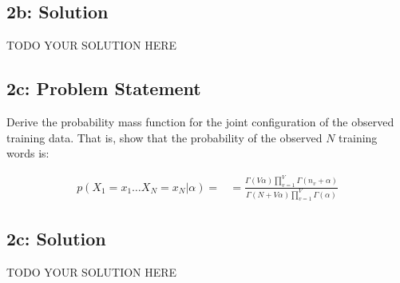 \documentclass[12pt]{article}
\newcommand{\officialdirections}[1]{{\color{blue} #1}}
\begin{document}
\subsection{2b: Solution}

TODO YOUR SOLUTION HERE

\newpage
\officialdirections{
\subsection*{2c: Problem Statement}


Derive the probability mass function for the joint configuration of the observed training data. 
That is, show that the probability of the observed $N$ training words is:

\begin{align}
p( X_1 = x_1 \ldots X_N = x_N | \alpha) = 
	&= \frac
	{ \Gamma(V \alpha)      \prod_{v=1}^V \Gamma( n_v + \alpha ) }
	{ \Gamma(N + V \alpha ) \prod_{v=1}^V \Gamma(\alpha)         }
\end{align}
}


\subsection{2c: Solution}


TODO YOUR SOLUTION HERE
\end{document}
